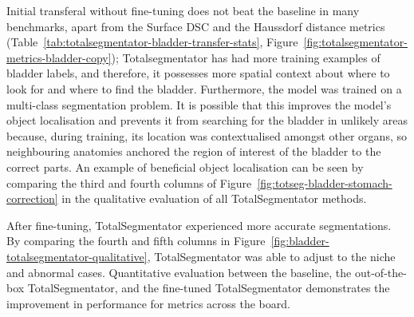 \documentclass[11pt,twoside]{report}
\begin{document}
Initial transferal without fine-tuning does not beat the baseline in many benchmarks, apart from the Surface DSC and the Haussdorf distance metrics (Table~\ref{tab:totalsegmentator-bladder-transfer-stats}, Figure~\ref{fig:totalsegmentator-metrics-bladder-copy}); Totalsegmentator has had more training examples of bladder labels, and therefore, it possesses more spatial context about where to look for and where to find the bladder. Furthermore, the model was trained on a multi-class segmentation problem. It is possible that this improves the model's object localisation and prevents it from searching for the bladder in unlikely areas because, during training, its location was contextualised amongst other organs, so neighbouring anatomies anchored the region of interest of the bladder to the correct parts. An example of beneficial object localisation can be seen by comparing the third and fourth columns of Figure~\ref{fig:totseg-bladder-stomach-correction} in the qualitative evaluation of all TotalSegmentator methods.

After fine-tuning, TotalSegmentator experienced more accurate segmentations. By comparing the fourth and fifth columns in Figure~\ref{fig:bladder-totalsegmentator-qualitative}, TotalSegmentator was able to adjust to the niche and abnormal cases. Quantitative evaluation between the baseline, the out-of-the-box TotalSegmentator, and the fine-tuned TotalSegmentator demonstrates the improvement in performance for metrics across the board.
\end{document}
